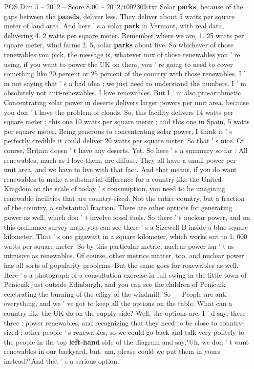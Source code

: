 \begin{textsample}{POS Dim 5 – 2012 – Score 8.00 – 2012/t002309.txt}
Solar \textbf{parks}, because of the gaps between the \textbf{panels}, deliver less.
They deliver about 5 watts per square meter of land area.
And here ' s a solar \textbf{park} in Vermont, with real data, delivering 4. 2 watts per square meter.
Remember where we are, 1. 25 watts per square meter, wind farms 2. 5, solar \textbf{parks} about five.
So whichever of those renewables you pick, the message is, whatever mix of those renewables you ' re using, if you want to power the UK on them, you ' re going to need to cover something like 20 percent or 25 percent of the country with those renewables.
I ' m not saying that ' s a bad idea ; we just need to understand the numbers.
I ' m absolutely not anti-renewables.
I love renewables.
But I ' m also pro-arithmetic.
Concentrating solar power in deserts delivers larger powers per unit area, because you don ' t have the problem of clouds.
So, this facility delivers 14 watts per square meter ; this one 10 watts per square meter ; and this one in Spain, 5 watts per square meter.
Being generous to concentrating solar power, I think it ' s perfectly credible it could deliver 20 watts per square meter.
So that ' s nice.
Of course, Britain doesn ' t have any deserts.
Yet.
So here ' s a summary so far : All renewables, much as I love them, are diffuse.
They all have a small power per unit area, and we have to live with that fact.
And that means, if you do want renewables to make a substantial difference for a country like the United Kingdom on the scale of today ' s consumption, you need to be imagining renewable facilities that are country-sized.
Not the entire country, but a fraction of the country, a substantial fraction.
There are other options for generating power as well, which don ' t involve fossil fuels.
So there ' s nuclear power, and on this ordinance survey map, you can see there ' s a Sizewell B inside a blue square kilometer.
That ' s one gigawatt in a square kilometer, which works out to 1, 000 watts per square meter.
So by this particular metric, nuclear power isn ' t as intrusive as renewables.
Of course, other metrics matter, too, and nuclear power has all sorts of popularity problems.
But the same goes for renewables as well.
Here ' s a photograph of a consultation exercise in full swing in the little town of Penicuik just outside Edinburgh, and you can see the children of Penicuik celebrating the burning of the effigy of the windmill.
So — People are anti-everything, and we ' ve got to keep all the options on the table.
What can a country like the UK do on the supply side?
Well, the options are, I ' d say, these three : power renewables, and recognizing that they need to be close to country-sized ; other people ' s renewables, so we could go back and talk very politely to the people in the top \textbf{left-hand} side of the diagram and say,"Uh, we don ' t want renewables in our backyard, but, um, please could we put them in yours instead?"And that ' s a serious option.

\end{textsample}
